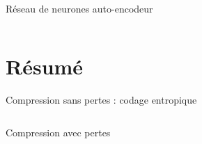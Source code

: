 \documentclass[9pt, aspectratio=169]{beamer}
\begin{document}
\begin{frame}{Réseau de neurones auto-encodeur} %
\begin{columns}
   \begin{column}{0.48\textwidth}
   \end{column}
   \begin{column}{0.48\textwidth}
   \end{column}
\end{columns}
\end{frame}

\section{Résumé}

\begin{frame}{} %
\begin{center}
\Huge \insertsection
\end{center}
\end{frame}

\begin{frame}{Compression sans pertes : codage entropique} %
\begin{columns}
   \begin{column}{0.48\textwidth}
   \end{column}
   \begin{column}{0.48\textwidth}
   \end{column}
\end{columns}
\end{frame}

\begin{frame}{Compression avec pertes} %
\begin{columns}
   \begin{column}{0.48\textwidth}
   \end{column}
   \begin{column}{0.48\textwidth}
   \end{column}
\end{columns}
\end{frame}
\end{document}
